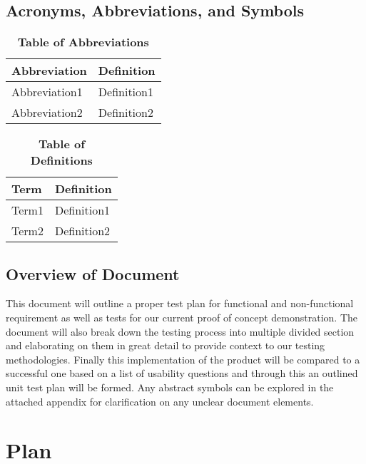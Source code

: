 \documentclass[12pt, titlepage]{article}
\begin{document}
\subsection{Acronyms, Abbreviations, and Symbols}
	
\begin{table}[hbp]
\caption{\textbf{Table of Abbreviations}} \label{Table}

\begin{tabularx}{\textwidth}{p{3cm}X}
\toprule
\textbf{Abbreviation} & \textbf{Definition} \\
\midrule
Abbreviation1 & Definition1\\
Abbreviation2 & Definition2\\
\bottomrule
\end{tabularx}

\end{table}

\begin{table}[!htbp]
\caption{\textbf{Table of Definitions}} \label{Table}

\begin{tabularx}{\textwidth}{p{3cm}X}
\toprule
\textbf{Term} & \textbf{Definition}\\
\midrule
Term1 & Definition1\\
Term2 & Definition2\\
\bottomrule
\end{tabularx}

\end{table}	

\subsection{Overview of Document}
This document will outline a proper test plan for functional and non-functional requirement as well as tests for our current proof of concept demonstration. The document will also break down the testing process into multiple divided section and elaborating on them in great detail to provide context to our testing methodologies. Finally this implementation of the product will be compared to a successful one based on a list of usability questions and through this an outlined unit test plan will be formed. Any abstract symbols can be explored in the attached appendix for clarification on any unclear document elements.
\section{Plan}
	
\end{document}
